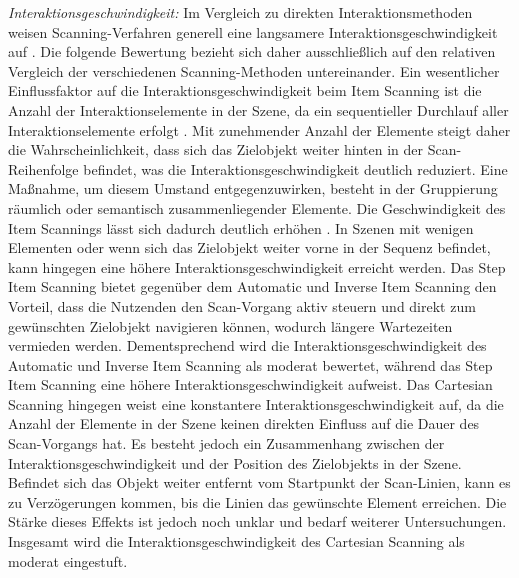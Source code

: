 \textit{Interaktionsgeschwindigkeit:}
Im Vergleich zu direkten Interaktionsmethoden weisen Scanning-Verfahren generell eine langsamere Interaktionsgeschwindigkeit auf \citep{COOK2015117}. Die folgende Bewertung bezieht sich daher ausschließlich auf den relativen Vergleich der verschiedenen Scanning-Methoden untereinander. 
Ein wesentlicher Einflussfaktor auf die Interaktionsgeschwindigkeit beim Item Scanning ist die Anzahl der Interaktionselemente in der Szene, da ein sequentieller Durchlauf aller Interaktionselemente erfolgt \cite{10.1145/2159365.2159386}. Mit zunehmender Anzahl der Elemente steigt daher die Wahrscheinlichkeit, dass sich das Zielobjekt weiter hinten in der Scan-Reihenfolge befindet, was die Interaktionsgeschwindigkeit deutlich reduziert. Eine Maßnahme, um diesem Umstand entgegenzuwirken, besteht in der Gruppierung räumlich oder semantisch zusammenliegender Elemente. Die Geschwindigkeit des Item Scannings lässt sich dadurch deutlich erhöhen \citep{COOK2015117}. In Szenen mit wenigen Elementen oder wenn sich das Zielobjekt weiter vorne in der Sequenz befindet, kann hingegen eine höhere Interaktionsgeschwindigkeit erreicht werden. Das Step Item Scanning bietet gegenüber dem Automatic und Inverse Item Scanning den Vorteil, dass die Nutzenden den Scan-Vorgang aktiv steuern und direkt zum gewünschten Zielobjekt navigieren können, wodurch längere Wartezeiten vermieden werden. Dementsprechend wird die Interaktionsgeschwindigkeit des Automatic und Inverse Item Scanning als moderat bewertet, während das Step Item Scanning eine höhere Interaktionsgeschwindigkeit aufweist.
Das Cartesian Scanning hingegen weist eine konstantere Interaktionsgeschwindigkeit auf, da die Anzahl der Elemente in der Szene keinen direkten Einfluss auf die Dauer des Scan-Vorgangs hat. Es besteht jedoch ein Zusammenhang zwischen der Interaktionsgeschwindigkeit und der Position des Zielobjekts in der Szene. Befindet sich das Objekt weiter entfernt vom Startpunkt der Scan-Linien, kann es zu Verzögerungen kommen, bis die Linien das gewünschte Element erreichen. Die Stärke dieses Effekts ist jedoch noch unklar und bedarf weiterer Untersuchungen. Insgesamt wird die Interaktionsgeschwindigkeit des Cartesian Scanning als moderat eingestuft.

